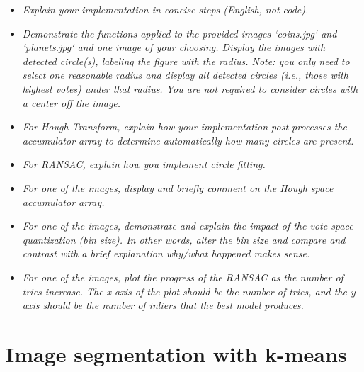 \documentclass[11pt]{article}
\begin{document}
    \begin{itemize}
        \item \textit{Explain your implementation in concise steps (English, not code).}\newline

        \item \textit{Demonstrate the functions applied to the provided images ‘coins.jpg‘ and ‘planets.jpg‘ and one
        image of your choosing. Display the images with detected circle(s), labeling the figure with the radius.
        Note: you only need to select one reasonable radius and display all detected circles
            (i.e., those with highest votes) under that radius.
            You are not required to consider circles with a center off the image.}\newline

        \item \textit{For Hough Transform, explain how your implementation post-processes the
        accumulator array to determine automatically how many circles are present.}\newline

        \item \textit{For RANSAC, explain how you implement circle fitting.}\newline

        \item \textit{For one of the images, display and briefly comment on the Hough space accumulator array.}\newline

        \item \textit{For one of the images, demonstrate and explain the impact of the vote space quantization (bin
        size). In other words, alter the bin size and compare and contrast with a brief explanation why/what happened
        makes sense.}\newline

        \item \textit{For one of the images, plot the progress of the RANSAC as the number of tries increase. The x axis
        of the plot should be the number of tries, and the y axis should be the number of inliers that the best model
        produces.}\newline

    \end{itemize}


    \section{Image segmentation with k-means}
\end{document}
